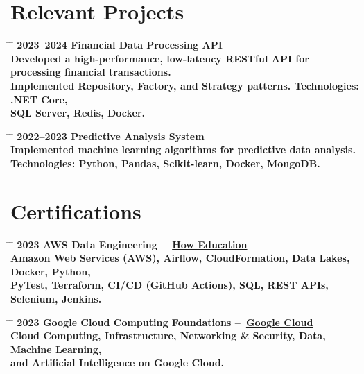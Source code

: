 \documentclass{article}
\begin{document}
\section*{Relevant Projects}

\begin{tabbing}
  \hspace{2cm} \= \hspace{4cm} \= \kill
  \bf{2023--2024} \> \textbf{Financial Data Processing API} \\
  \> Developed a high-performance, low-latency RESTful API for processing financial transactions. \\
  \> Implemented Repository, Factory, and Strategy patterns. \textbf{Technologies:} {.NET Core}, \\
  \> SQL Server, Redis, Docker. \\
\end{tabbing}

\begin{tabbing}
  \hspace{2cm} \= \hspace{4cm} \= \kill
  \bf{2022--2023} \> \textbf{Predictive Analysis System} \\
  \> Implemented machine learning algorithms for predictive data analysis. \\
  \> \textbf{Technologies:} Python, Pandas, Scikit-learn, Docker, {MongoDB}. \\
\end{tabbing}

\section*{Certifications}

\begin{tabbing}
  \hspace{2cm} \= \hspace{4cm} \= \kill
  \bf{2023} \> \textbf{AWS Data Engineering} –~\href{https://howedu.com.br/}{How Education} \\
  \> Amazon Web Services (AWS), Airflow, CloudFormation, Data Lakes, Docker, Python, \\
  \> PyTest, Terraform, CI/CD (GitHub Actions), SQL, REST APIs, Selenium, Jenkins. \\
\end{tabbing}

\begin{tabbing}
  \hspace{2cm} \= \hspace{4cm} \= \kill
  \bf{2023} \> \textbf{Google Cloud Computing Foundations} –~\href{https://www.cloudskillsboost.google/public_profiles/3a03b48f-00f0-42a3-9800-4c045d78b21e/badges/3540421}{Google Cloud} \\
  \> Cloud Computing, Infrastructure, Networking \& Security, Data, Machine Learning, \\
  \> and Artificial Intelligence on Google Cloud. \\
\end{tabbing}
\end{document}
